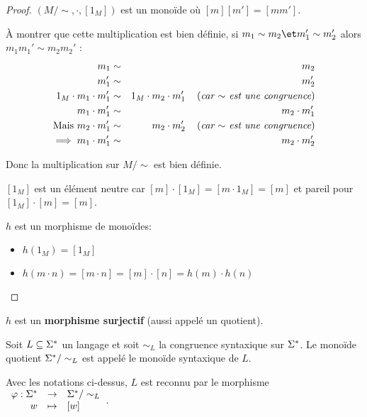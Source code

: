 \begin{proof}
	$(M/\sim, \cdot, [1_M])$ est un monoïde où $[m][m'] = [mm']$.

	À montrer que cette multiplication est bien définie, \cad si $m_1 \sim m_2 \et m_1' \sim m_2'$ alors $m_1 m_1' \sim m_2 m_2'$ :
	\begin{eqnarray*}
		m_1 &\sim& m_2 \\
		m_1' &\sim& m_2' \\
		1_M \cdot  m_1 \cdot m_1' &\sim& 1_M \cdot m_2 \cdot m_1' \quad\left(\textit{car $\sim$ est une congruence}\right) \\
		m_1 \cdot m_1' &\sim&  m_2 \cdot m_1' \\
		\text{Mais } m_2 \cdot m_1' &\sim& m_2 \cdot m_2' \quad\left(\textit{car $\sim$ est une congruence}\right) \\
		\implies m_1 \cdot m_1' &\sim& m_2 \cdot m_2'
	\end{eqnarray*}

	Donc la multiplication sur $M/\sim$ est bien définie.


	$[1_M]$ est un élément neutre car $[m]\cdot [1_M] = [m \cdot 1_M] = [m]$ et pareil pour $[1_M]\cdot [m] = [m]$.

	$h$ est un morphisme de monoïdes:

	\begin{itemize}
		\item  $h(1_M) = [1_M]$
		\item  $h(m\cdot n) = [m \cdot n] = [m] \cdot [n] = h(m) \cdot h(n)$
	\end{itemize}
\end{proof}

\begin{remarque}
	$h$ est un \textbf{morphisme surjectif} (aussi appelé un quotient).
\end{remarque}

\begin{definition}
	Soit $L \subseteq \Sigma^{*}$ un langage et soit $\sim_L$ la congruence syntaxique sur $\Sigma^{*}$.
	Le monoïde quotient $\Sigma^{*} / \sim_L$ est appelé le monoïde syntaxique de $L$.
\end{definition}

\begin{prop}
	Avec les notations ci-dessus, $L$ est reconnu par le morphisme
	$ \begin{array}{rcl}
			\varphi : \Sigma^{*} & \to     & \Sigma^{*}/\sim_L \\
			w            & \mapsto & [w]
		\end{array} $.
\end{prop}


